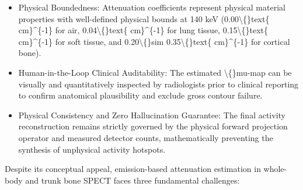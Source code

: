 \documentclass[11pt]{article}
\begin{document}
\begin{itemize}\item Physical Boundedness: Attenuation coefficients represent physical material properties with well-defined physical bounds at 140 keV (0.00\textbackslash\{\}text\{ cm\}\textasciicircum{}\{-1\} for air, 0.04\textbackslash\{\}text\{ cm\}\textasciicircum{}\{-1\} for lung tissue, 0.15\textbackslash\{\}text\{ cm\}\textasciicircum{}\{-1\} for soft tissue, and 0.20\textbackslash\{\}sim 0.35\textbackslash\{\}text\{ cm\}\textasciicircum{}\{-1\} for cortical bone).\end{itemize}
\begin{itemize}\item Human-in-the-Loop Clinical Auditability: The estimated \textbackslash\{\}mu-map can be visually and quantitatively inspected by radiologists prior to clinical reporting to confirm anatomical plausibility and exclude gross contour failure.\end{itemize}
\begin{itemize}\item Physical Consistency and Zero Hallucination Guarantee: The final activity reconstruction remains strictly governed by the physical forward projection operator and measured detector counts, mathematically preventing the synthesis of unphysical activity hotspots.\end{itemize}
Despite its conceptual appeal, emission-based attenuation estimation in whole-body and trunk bone SPECT faces three fundamental challenges:\par
\end{document}

